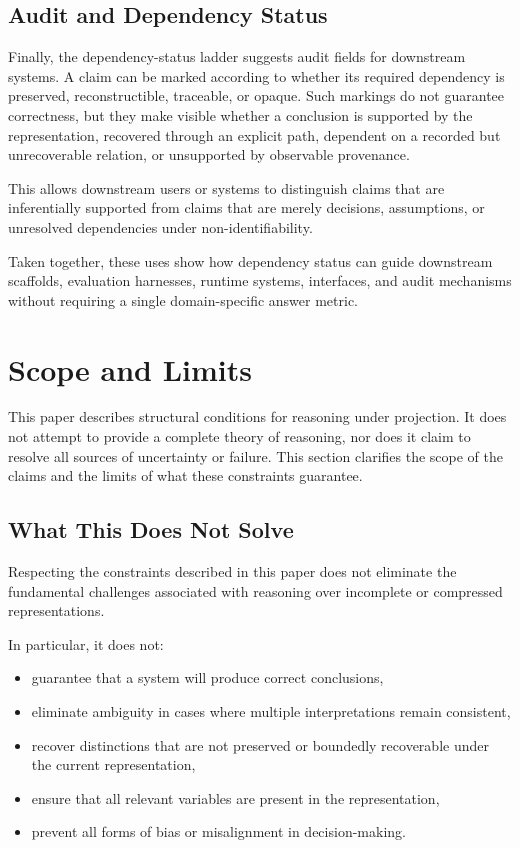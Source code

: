 \documentclass[11pt]{article}
\begin{document}
\subsection{Audit and Dependency Status}

Finally, the dependency-status ladder suggests audit fields for downstream systems. A claim can be marked according to whether its required dependency is preserved, reconstructible, traceable, or opaque. Such markings do not guarantee correctness, but they make visible whether a conclusion is supported by the representation, recovered through an explicit path, dependent on a recorded but unrecoverable relation, or unsupported by observable provenance.

This allows downstream users or systems to distinguish claims that are inferentially supported from claims that are merely decisions, assumptions, or unresolved dependencies under non-identifiability.

Taken together, these uses show how dependency status can guide downstream scaffolds, evaluation harnesses, runtime systems, interfaces, and audit mechanisms without requiring a single domain-specific answer metric.

\section{Scope and Limits}

This paper describes structural conditions for reasoning under projection. It does not attempt to provide a complete theory of reasoning, nor does it claim to resolve all sources of uncertainty or failure. This section clarifies the scope of the claims and the limits of what these constraints guarantee.

\subsection{What This Does Not Solve}

Respecting the constraints described in this paper does not eliminate the fundamental challenges associated with reasoning over incomplete or compressed representations.

In particular, it does not:

\begin{itemize}[leftmargin=1.5em]
    \item guarantee that a system will produce correct conclusions,
    \item eliminate ambiguity in cases where multiple interpretations remain consistent,
    \item recover distinctions that are not preserved or boundedly recoverable under the current representation,
    \item ensure that all relevant variables are present in the representation,
    \item prevent all forms of bias or misalignment in decision-making.
\end{itemize}
\end{document}
